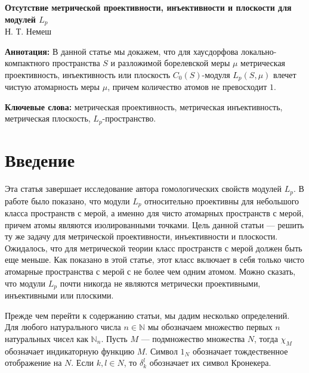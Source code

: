 \documentclass[12pt]{article}
\begin{document}
\begin{center}
    \Large \textbf{Отсутствие метрической проективности, инъективности и 
    плоскости для модулей $L_p$}\\[0.5cm]
    \small {Н. Т. Немеш}\\[0.5cm]
\end{center}

\thispagestyle{empty}

\medskip
\textbf{Аннотация:} В данной статье мы докажем, что для хаусдорфова 
локально-компактного пространства $S$ и разложимой борелевской меры $\mu$ 
метрическая проективность, инъективность или 
плоскость $C_0(S)$-модуля $L_p(S,\mu)$ влечет чистую атомарность меры $\mu$, 
причем количество атомов не превосходит $1$.
\medskip

\textbf{Ключевые слова:} метрическая проективность, метрическая инъективность, 
метрическая плоскость, $L_p$-пространство.

\bigskip


\section{Введение}\label{SctnIntro}

Эта статья завершает исследование автора гомологических свойств модулей $L_p$. 
В работе \cite{NemRelProjModLp} было показано, что модули $L_p$ относительно 
проективны для небольшого класса пространств с мерой, а именно для чисто 
атомарных пространств с мерой, причем атомы являются изолированными точками. Цель 
данной статьи --- решить ту же задачу для метрической проективности, 
инъективности и плоскости. Ожидалось, что для метрической теории класс 
пространств с мерой должен быть еще меньше. Как показано в этой статье, этот 
класс включает в себя только чисто атомарные пространства с мерой с не более 
чем одним атомом. Можно сказать, что модули $L_p$ почти 
никогда не являются метрически проективными, инъективными или плоскими.

Прежде чем перейти к содержанию статьи, мы дадим несколько определений. 
Для любого натурального числа $n\in\mathbb{N}$ мы обозначаем множество первых 
$n$ натуральных чисел как $\mathbb{N}_n$. Пусть $M$ --- подмножество множества 
$N$, тогда $\chi_M$ обозначает индикаторную функцию $M$. Символ $1_N$ обозначает 
тождественное отображение на $N$. Если $k,l\in N$, то $\delta_{k}^{l}$ обозначает 
их символ Кронекера.
\end{document}

